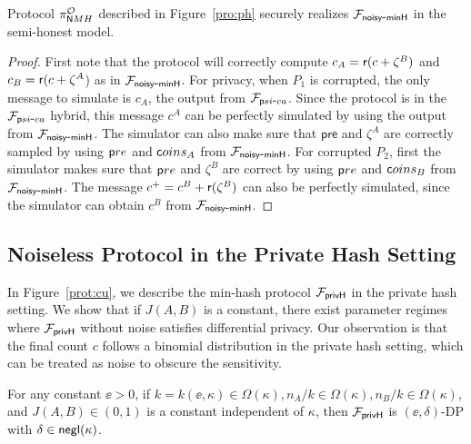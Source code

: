 \begin{proposition}
Protocol $\PPH^{\mathcal{O}}$ described in Figure~\ref{pro:ph} securely realizes $\Pbasenoisy$ in the semi-honest model. 
\end{proposition}
\begin{proof} 
First note that the protocol will correctly compute $c_A = \round(c + \zeta^B)$ and $c_B = \round(c + \zeta^A$) as in $\Pbasenoisy$. 
For privacy, when $P_1$ is corrupted, the only message to simulate is $c_A$, the output from $\F_{\psica}$. Since the protocol is in the $\F_{\psica}$ hybrid, this message $c^A$ can be perfectly simulated by using the output from $\Pbasenoisy$. The simulator can also make sure that $\mathsf{pre}$ and $\zeta^A$ are correctly sampled by using $\sf pre$ and $\coins_A$ from $\Pbasenoisy$. For corrupted $P_2$, first the simulator makes sure that $\sf pre$ and $\zeta^B$ are correct by using $\sf pre$ and $\coins_B$ from $\Pbasenoisy$. The message $c^+ = c^B + \round(\zeta^B)$ can also be perfectly simulated, since the simulator can obtain $c^B$ from $\Pbasenoisy$.
\end{proof}





\subsection{Noiseless Protocol in the Private Hash Setting} \label{sec:curator}
In Figure~\ref{prot:cu}, we describe the min-hash protocol $\PC$ in the private
hash setting. We show that if $J(A, B)$ is a constant, there exist parameter
regimes where $\PC$ without noise satisfies differential privacy. Our
observation is that the final count $c$ follows a binomial distribution in the
private hash setting, which can be treated as noise to obscure the sensitivity.





\begin{theorem}\label{thm:PrivH}
For any constant $\ee > 0$, if  $k = k(\ee, \kappa) \in \Omega(\kappa),
n_A/k \in \Omega(\kappa), n_B/k \in \Omega(\kappa)$, and $J(A, B) \in
(0, 1)$ is a constant independent of $\kappa$, then $\PC$ is
$(\ee,\delta)$-DP with $\delta \in \negl(\kappa)$.
\end{theorem}


